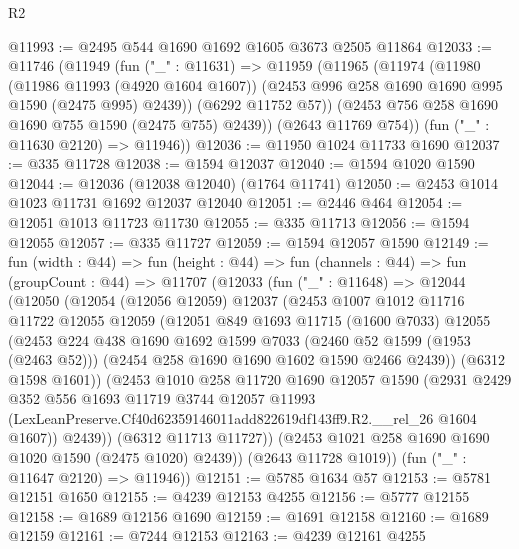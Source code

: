 \begin{lexlean}{R2}
\begin{coremodule}
@11993 := @2495 @544 @1690 @1692 @1605 @3673 @2505 @11864
@12033 := @11746
    (@11949
      (fun ("_" : @11631) =>
      @11959
        (@11965
          (@11974
            (@11980
              (@11986 @11993 (@4920 @1604 @1607))
              (@2453 @996 @258 @1690 @1690 @995 @1590 (@2475 @995) @2439))
            (@6292 @11752 @57))
          (@2453 @756 @258 @1690 @1690 @755 @1590 (@2475 @755) @2439))
        (@2643 @11769 @754))
      (fun ("_" : @11630 @2120) => @11946))
@12036 := @11950 @1024 @11733 @1690
@12037 := @335 @11728
@12038 := @1594 @12037
@12040 := @1594 @1020 @1590
@12044 := @12036 (@12038 @12040) (@1764 @11741)
@12050 := @2453 @1014 @1023 @11731 @1692 @12037 @12040
@12051 := @2446 @464
@12054 := @12051 @1013 @11723 @11730
@12055 := @335 @11713
@12056 := @1594 @12055
@12057 := @335 @11727
@12059 := @1594 @12057 @1590
@12149 := fun (width : @44) =>
  fun (height : @44) =>
  fun (channels : @44) =>
  fun (groupCount : @44) =>
  @11707
    (@12033
      (fun ("_" : @11648) =>
      @12044
        (@12050
          (@12054
            (@12056 @12059)
            @12037
            (@2453
              @1007
              @1012
              @11716
              @11722
              @12055
              @12059
              (@12051
                @849
                @1693
                @11715
                (@1600 @7033)
                @12055
                (@2453
                  @224
                  @438
                  @1690
                  @1692
                  @1599
                  @7033
                  (@2460 @52 @1599 (@1953 (@2463 @52)))
                  (@2454 @258 @1690 @1690 @1602 @1590 @2466 @2439))
                (@6312 @1598 @1601))
              (@2453
                @1010
                @258
                @11720
                @1690
                @12057
                @1590
                (@2931
                  @2429
                  @352
                  @556
                  @1693
                  @11719
                  @3744
                  @12057
                  @11993
                  (LexLeanPreserve.Cf40d62359146011add822619df143ff9.R2.__rel_26 @1604 @1607))
                @2439))
            (@6312 @11713 @11727))
          (@2453 @1021 @258 @1690 @1690 @1020 @1590 (@2475 @1020) @2439))
        (@2643 @11728 @1019))
      (fun ("_" : @11647 @2120) => @11946))
@12151 := @5785 @1634 @57
@12153 := @5781 @12151 @1650
@12155 := @4239 @12153 @4255
@12156 := @5777 @12155
@12158 := @1689 @12156 @1690
@12159 := @1691 @12158
@12160 := @1689 @12159
@12161 := @7244 @12153
@12163 := @4239 @12161 @4255

\end{coremodule}
\end{lexlean}
